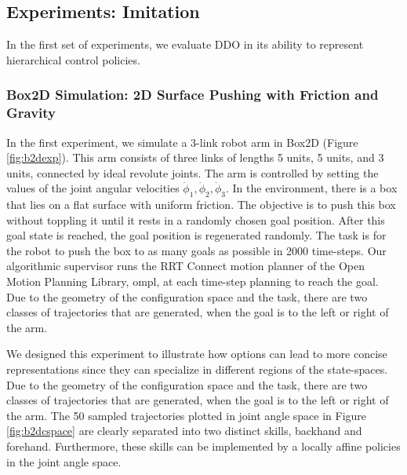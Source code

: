 \subsection{Experiments: Imitation}
In the first set of experiments, we evaluate DDO in its ability to represent hierarchical control policies. 

\subsubsection{Box2D Simulation: 2D Surface Pushing with Friction and Gravity}
In the first experiment, we simulate a 3-link robot arm in Box2D (Figure \ref{fig:b2dexp}). This arm consists of three links of lengths 5 units, 5 units, and 3 units, connected by ideal revolute joints. The arm is controlled by setting the values of the joint angular velocities $\dot{\phi}_1, \dot{\phi}_2, \dot{\phi}_3$. In the environment, there is a box that lies on a flat surface with uniform friction. The objective is to push this box without toppling it until it rests in a randomly chosen goal position. After this goal state is reached, the goal position is regenerated randomly.
The task is for the robot to push the box to as many goals as possible in 2000 time-steps.
Our algorithmic supervisor runs the RRT Connect motion planner of the Open Motion Planning Library, \textsf{ompl}, at each time-step planning to reach the goal. 
Due to the geometry of the configuration space and the task, there are two classes of trajectories that are generated, when the goal is to the left or right of the arm. 

We designed this experiment to illustrate how options can lead to more concise representations since they can specialize in different regions of the state-spaces.
Due to the geometry of the configuration space and the task, there are two classes of trajectories that are generated, when the goal is to the left or right of the arm.
The 50 sampled trajectories plotted in joint angle space in Figure \ref{fig:b2dcspace} are clearly separated into two distinct skills, backhand and forehand. 
Furthermore, these skills can be implemented by a locally affine policies in the joint angle space.

